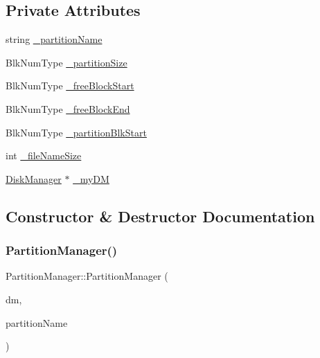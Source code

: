 \subsection*{Private Attributes}
\begin{DoxyCompactItemize}
\item 
string \mbox{\hyperlink{class_partition_manager_abce2f4d0702d84f4fafd604a4d6177bc}{\+\_\+partition\+Name}}
\item 
Blk\+Num\+Type \mbox{\hyperlink{class_partition_manager_adc40203c47c043cbef87bd5299462861}{\+\_\+partition\+Size}}
\item 
Blk\+Num\+Type \mbox{\hyperlink{class_partition_manager_aef90b039f531993d85ecca490e6372c0}{\+\_\+free\+Block\+Start}}
\item 
Blk\+Num\+Type \mbox{\hyperlink{class_partition_manager_a76dddfb3211f1a6bb428ea883c16f9fe}{\+\_\+free\+Block\+End}}
\item 
Blk\+Num\+Type \mbox{\hyperlink{class_partition_manager_aec878e091e469ed20dc49c932ae22ad3}{\+\_\+partition\+Blk\+Start}}
\item 
int \mbox{\hyperlink{class_partition_manager_aa934a144c41a546a83c80965428bc0dd}{\+\_\+file\+Name\+Size}}
\item 
\mbox{\hyperlink{class_disk_manager}{Disk\+Manager}} $\ast$ \mbox{\hyperlink{class_partition_manager_a87f98cf8538d89dd4b2bb46ea33d85cd}{\+\_\+my\+DM}}
\end{DoxyCompactItemize}


\subsection{Constructor \& Destructor Documentation}
\mbox{\label{class_partition_manager_aa875b0b19b7ab9f32b02d2c9be383b75}} 
\subsubsection{\texorpdfstring{Partition\+Manager()}{PartitionManager()}}
{\footnotesize\ttfamily Partition\+Manager\+::\+Partition\+Manager (\begin{DoxyParamCaption}\item[{\mbox{\hyperlink{class_disk_manager}{Disk\+Manager}} $\ast$}]{dm,  }\item[{string}]{partition\+Name }\end{DoxyParamCaption})}


